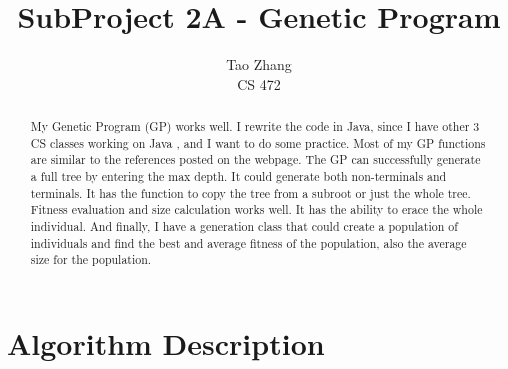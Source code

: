 \documentclass[12pt]{article}
\begin{document}
\title{SubProject 2A  - Genetic Program}

\author{Tao Zhang\\
CS 472}

\maketitle
\newpage

\begin{abstract}
My Genetic Program (GP) works well. I rewrite the code in Java, since I have other 3 CS classes working on Java , and I want to do some practice. Most of my GP functions are similar to the references posted on the webpage. The GP can successfully generate a full tree by entering the max depth. It could generate both non-terminals and terminals. It has the function to copy the tree from a subroot or just the whole tree. Fitness evaluation and size calculation works well. It has the ability to erace the whole individual. And finally, I have a generation class that could create a population of individuals and find the best and average fitness of the population, also the average size for the population.
\end{abstract}

\section{Algorithm Description}
\end{document}
